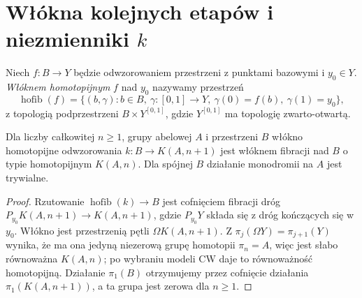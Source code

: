 \section{Włókna kolejnych etapów i niezmienniki \texorpdfstring{$k$}{k}}
\begin{definicja}
Niech $f:B\to Y$ będzie odwzorowaniem przestrzeni z punktami
bazowymi i $y_0\in Y$. \emph{Włóknem homotopijnym} $f$
nad $y_0$ nazywamy przestrzeń
\[
\operatorname{hofib}(f)=\{(b,\gamma):b\in B,
\ \gamma:[0,1]\to Y,\ \gamma(0)=f(b),\ \gamma(1)=y_0\},
\]
z topologią podprzestrzeni $B\times Y^{[0,1]}$,
gdzie $Y^{[0,1]}$ ma topologię zwarto-otwartą.
\end{definicja}

\begin{lemat}
\label{lem:hofib-K-v7}
Dla liczby całkowitej $n\ge1$, grupy abelowej $A$
i przestrzeni $B$ włókno homotopijne
odwzorowania $k:B\to K(A,n+1)$ jest włóknem fibracji
nad $B$ o typie homotopijnym $K(A,n)$.
Dla spójnej $B$ działanie monodromii na $A$ jest trywialne.
\end{lemat}
\begin{proof}
Rzutowanie $\operatorname{hofib}(k)\to B$ jest cofnięciem
fibracji dróg $P_{y_0}K(A,n+1)\to K(A,n+1)$,
gdzie $P_{y_0}Y$ składa się z dróg kończących się w $y_0$.
Włókno jest przestrzenią pętli $\Omega K(A,n+1)$.
Z $\pi_j(\Omega Y)=\pi_{j+1}(Y)$ wynika, że ma ona
jedyną niezerową grupę homotopii $\pi_n=A$,
więc jest słabo równoważna $K(A,n)$; po wybraniu
modeli CW daje to równoważność homotopijną.
Działanie $\pi_1(B)$ otrzymujemy przez cofnięcie
działania $\pi_1(K(A,n+1))$, a ta grupa jest zerowa
dla $n\ge1$.
\end{proof}

